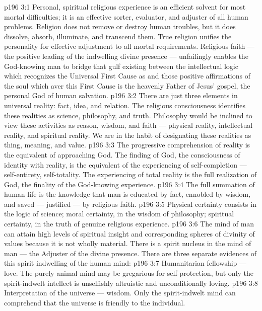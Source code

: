\vs p196 3:1 Personal, spiritual religious experience is an efficient solvent for most mortal difficulties; it is an effective sorter, evaluator, and adjuster of all human problems. Religion does not remove or destroy human troubles, but it does dissolve, absorb, illuminate, and transcend them. True religion unifies the personality for effective adjustment to all mortal requirements. Religious faith --- the positive leading of the indwelling divine presence --- unfailingly enables the God\hyp{}knowing man to bridge that gulf existing between the intellectual logic which recognizes the Universal First Cause as  and those positive affirmations of the soul which aver this First Cause is  the heavenly Father of Jesus’ gospel, the personal God of human salvation.
\vs p196 3:2 There are just three elements in universal reality: fact, idea, and relation. The religious consciousness identifies these realities as science, philosophy, and truth. Philosophy would be inclined to view these activities as reason, wisdom, and faith --- physical reality, intellectual reality, and spiritual reality. We are in the habit of designating these realities as thing, meaning, and value.
\vs p196 3:3 The progressive comprehension of reality is the equivalent of approaching God. The finding of God, the consciousness of identity with reality, is the equivalent of the experiencing of self\hyp{}completion --- self\hyp{}entirety, self\hyp{}totality. The experiencing of total reality is the full realization of God, the finality of the God\hyp{}knowing experience.
\vs p196 3:4 The full summation of human life is the knowledge that man is educated by fact, ennobled by wisdom, and saved --- justified --- by religious faith.
\vs p196 3:5 Physical certainty consists in the logic of science; moral certainty, in the wisdom of philosophy; spiritual certainty, in the truth of genuine religious experience.
\vs p196 3:6 The mind of man can attain high levels of spiritual insight and corresponding spheres of divinity of values because it is not wholly material. There is a spirit nucleus in the mind of man --- the Adjuster of the divine presence. There are three separate evidences of this spirit indwelling of the human mind:
\vs p196 3:7 \bibnobreakspace Humanitarian fellowship --- love. The purely animal mind may be gregarious for self\hyp{}protection, but only the spirit\hyp{}indwelt intellect is unselfishly altruistic and unconditionally loving.
\vs p196 3:8 \bibnobreakspace Interpretation of the universe --- wisdom. Only the spirit\hyp{}indwelt mind can comprehend that the universe is friendly to the individual.
